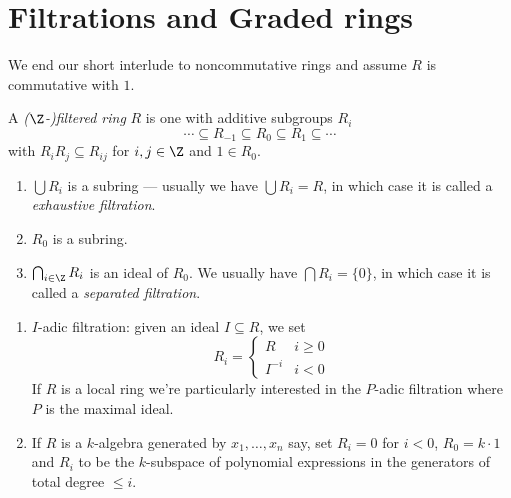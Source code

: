 \documentclass[a4paper]{article}
\begin{document}
\section{Filtrations and Graded rings}

We end our short interlude to noncommutative rings and assume \(R\) is commutative with \(1\).

\begin{definition}
  A \emph{(\(\Z\)-)filtered ring} \(R\) is one with additive subgroups \(R_i\)
  \[
    \cdots \subseteq R_{-1} \subseteq R_0 \subseteq R_1 \subseteq \cdots
  \]
  with \(R_i R_j \subseteq R_{ij}\) for  \(i, j \in \Z\) and \(1 \in R_0\).
\end{definition}

\begin{note}\leavevmode
  \begin{enumerate}
  \item \(\bigcup R_i\) is a subring --- usually we have \(\bigcup R_i = R\), in which case it is called a \emph{exhaustive filtration}.
  \item \(R_0\) is a subring.
  \item \(\bigcap_{i \in \Z} R_i\) is an ideal of \(R_0\). We usually have \(\bigcap R_i = \{0\}\), in which case it is called a \emph{separated filtration}.
  \end{enumerate}
\end{note}

\begin{eg}\leavevmode
  \begin{enumerate}
  \item \(I\)-adic filtration: given an ideal \(I \subseteq R\), we set
    \[
      R_i =
      \begin{cases}
        R & i \geq 0 \\
        I^{-i} & i < 0
      \end{cases}
    \]
    If \(R\) is a local ring we're particularly interested in the \(P\)-adic filtration where \(P\) is the maximal ideal.
  \item If \(R\) is a \(k\)-algebra generated by \(x_1, \dots, x_n\) say, set \(R_i = 0\) for \(i < 0\), \(R_0 = k \cdot 1\) and \(R_i\) to be the \(k\)-subspace of polynomial expressions in the generators of total degree \(\leq i\).
  \end{enumerate}
\end{eg}
\end{document}
